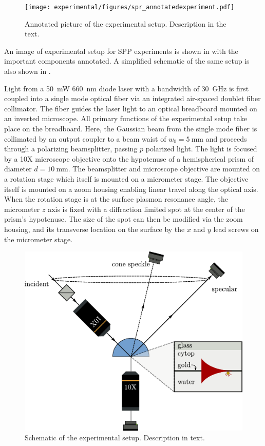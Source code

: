 \begin{figure}[ht]
 \centering
 \texttt{[image: experimental/figures/spr\_annotatedexperiment.pdf]}
 \caption{Annotated picture of the experimental setup.  Description in the
	text.}
 \label{fig:experimentalpicture}
\end{figure}

An image of experimental setup for SPP experiments is shown in
 with the important components annotated.
A simplified schematic of the same setup is also shown in
.

Light from a \SI{50}{\milli\watt} \SI{660}{\nano\meter} diode laser with a
bandwidth of \SI{30}{\giga\hertz} is first coupled into a single mode
optical fiber via an integrated air-spaced doublet fiber collimator.  The
fiber guides the laser light to an optical breadboard mounted on an
inverted microscope.  All primary functions of the experimental setup take
place on the breadboard.  Here, the Gaussian beam from the single mode
fiber is collimated by an output coupler to a beam waist of
$w_0=\SI{5}{\milli\meter}$ and proceeds through a polarizing beamsplitter,
passing $p$ polarized light.  The light is focused by a 10X microscope
objective onto the hypotenuse of a hemispherical prism of diameter
$d=\SI{10}{\milli\meter}$.  The beamsplitter and microscope objective are
mounted on a rotation stage which itself is mounted on a micrometer stage.
The objective itself is mounted on a zoom housing enabling linear travel
along the optical axis.  When the rotation stage is at the surface plasmon
resonance angle, the micrometer $z$ axis is fixed with a diffraction
limited spot at the center of the prism's hypotenuse.  The size of the spot
can then be modified via the zoom housing, and its transverse location on
the surface by the $x$ and $y$ lead screws on the micrometer stage.  
\begin{figure}[ht]
\centering
 \includegraphics[keepaspectratio]{experimental/figures/conefig.pdf}
 \caption{Schematic of the experimental setup.  Description in text.}
 \label{fig:experimentalsetup}
\end{figure}

